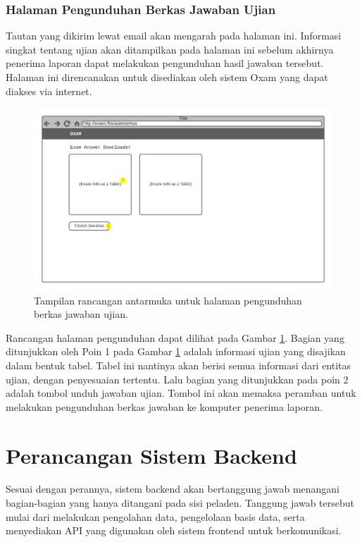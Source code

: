 \subsubsection{Halaman Pengunduhan Berkas Jawaban Ujian}
    Tautan yang dikirim lewat email akan mengarah pada halaman ini. Informasi
    singkat tentang ujian akan ditampilkan pada halaman ini sebelum akhirnya
    penerima laporan dapat melakukan pengunduhan hasil jawaban tersebut. Halaman
    ini direncanakan untuk disediakan oleh sistem Oxam yang dapat diakses via
    internet.
    
    \begin{figure}
        \centering
        \includegraphics[width=0.7\paperwidth]{Gambar/mockups/Mockup--Tambahan - Exam-extractor.pdf}
        \caption{Tampilan rancangan antarmuka untuk halaman pengunduhan berkas jawaban ujian.}
        \label{fig:mockup_addition_downloader}
    \end{figure}
    Rancangan halaman pengunduhan dapat dilihat pada Gambar
    \ref{fig:mockup_addition_downloader}. Bagian yang ditunjukkan oleh Poin 1
    pada Gambar \ref{fig:mockup_addition_downloader} adalah informasi ujian yang
    disajikan dalam bentuk tabel. Tabel ini nantinya akan berisi semua informasi
    dari entitas ujian, dengan penyesuaian tertentu. Lalu bagian yang
    ditunjukkan pada poin 2 adalah tombol unduh jawaban ujian. Tombol ini akan
    memaksa peramban untuk melakukan pengunduhan berkas jawaban ke komputer
    penerima laporan.
    
\section{Perancangan Sistem Backend}
    Sesuai dengan perannya, sistem backend akan bertanggung jawab menangani
    bagian-bagian yang hanya ditangani pada sisi peladen. Tanggung jawab
    tersebut mulai dari melakukan pengolahan data, pengelolaan basis data, serta
    menyediakan API yang digunakan oleh sistem frontend untuk berkomunikasi.
    
